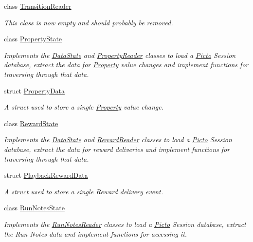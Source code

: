 \begin{DoxyCompactItemize}
class \hyperlink{class_picto_1_1_transition_reader}{Transition\-Reader}
\begin{DoxyCompactList}\small\item\em This class is now empty and should probably be removed. \end{DoxyCompactList}\item 
class \hyperlink{class_picto_1_1_property_state}{Property\-State}
\begin{DoxyCompactList}\small\item\em Implements the \hyperlink{class_picto_1_1_data_state}{Data\-State} and \hyperlink{class_picto_1_1_property_reader}{Property\-Reader} classes to load a \hyperlink{namespace_picto}{Picto} Session database, extract the data for \hyperlink{class_picto_1_1_property}{Property} value changes and implement functions for traversing through that data. \end{DoxyCompactList}\item 
struct \hyperlink{struct_picto_1_1_property_data}{Property\-Data}
\begin{DoxyCompactList}\small\item\em A struct used to store a single \hyperlink{class_picto_1_1_property}{Property} value change. \end{DoxyCompactList}\item 
class \hyperlink{class_picto_1_1_reward_state}{Reward\-State}
\begin{DoxyCompactList}\small\item\em Implements the \hyperlink{class_picto_1_1_data_state}{Data\-State} and \hyperlink{class_picto_1_1_reward_reader}{Reward\-Reader} classes to load a \hyperlink{namespace_picto}{Picto} Session database, extract the data for reward deliveries and implement functions for traversing through that data. \end{DoxyCompactList}\item 
struct \hyperlink{struct_picto_1_1_playback_reward_data}{Playback\-Reward\-Data}
\begin{DoxyCompactList}\small\item\em A struct used to store a single \hyperlink{class_picto_1_1_reward}{Reward} delivery event. \end{DoxyCompactList}\item 
class \hyperlink{class_picto_1_1_run_notes_state}{Run\-Notes\-State}
\begin{DoxyCompactList}\small\item\em Implements the \hyperlink{class_picto_1_1_run_notes_reader}{Run\-Notes\-Reader} classes to load a \hyperlink{namespace_picto}{Picto} Session database, extract the Run Notes data and implement functions for accessing it. \end{DoxyCompactList}\item 

\end{DoxyCompactItemize}
